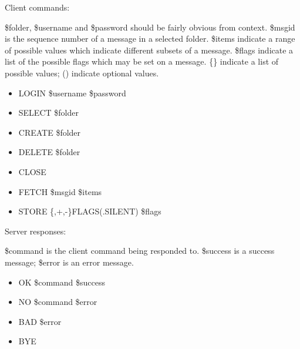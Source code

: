 \documentclass[a4paper,12pt]{article}
\begin{document}
Client commands:

\$folder, \$username and \$password should be fairly obvious from context. \$msgid is the sequence number of a message in a selected folder. \$items indicate a range of possible values which indicate different subsets of a message. \$flags indicate a list of the possible flags which may be set on a message. \{\} indicate a list of possible values; () indicate optional values.

\begin{itemize}
\item LOGIN \$username \$password
\item SELECT \$folder
\item CREATE \$folder
\item DELETE \$folder
\item CLOSE
\item FETCH \$msgid \$items
\item STORE \{,+,-\}FLAGS(.SILENT) \$flags
\end{itemize}

Server responses:

\$command is the client command being responded to. \$success is a success message; \$error is an error message.

\begin{itemize}
\item OK \$command \$success
\item NO \$command \$error
\item BAD \$error
\item BYE
\end{itemize}
\end{document}
